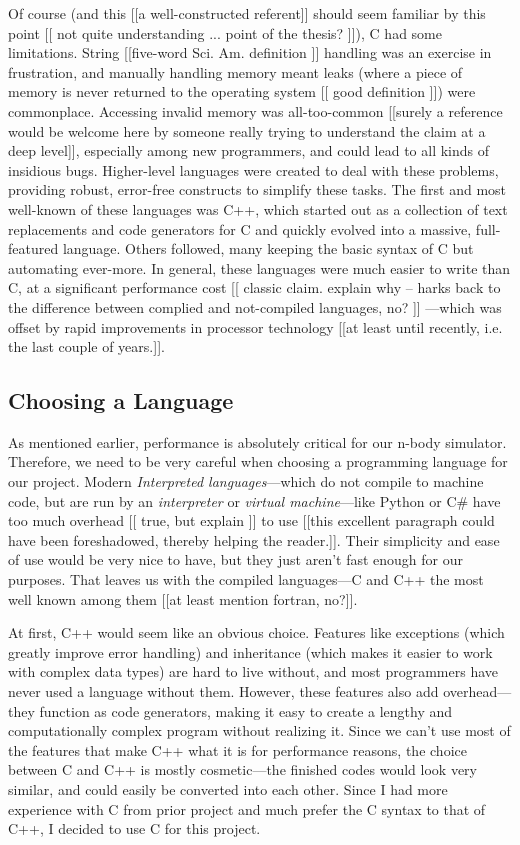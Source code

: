 \documentclass[thesis.tex]{subfiles}
\begin{document}
Of course (and this [[a well-constructed referent]] should seem familiar by this point [[  not quite understanding ... point of the thesis? ]]), C had some limitations. String [[five-word Sci. Am. definition ]] handling was an exercise in frustration, and manually handling memory meant leaks (where a piece of memory is never returned to the operating system [[ good definition  ]]) were commonplace. Accessing invalid memory was all-too-common [[surely a reference would be welcome here by someone really trying to understand the claim at a deep level]], especially among new programmers, and could lead to all kinds of insidious bugs. Higher-level languages were created to deal with these problems, providing robust, error-free constructs to simplify these tasks. The first and most well-known of these languages was C++, which started out as a collection of text replacements and code generators for C and quickly evolved into a massive, full-featured language. Others followed, many keeping the basic syntax of C but automating ever-more. In general, these languages were much easier to write than C, at a significant performance cost [[  classic claim. explain why -- harks back to the difference between complied and not-compiled languages, no? ]] ---which was offset by rapid improvements in processor technology [[at least until recently, i.e. the last couple of years.]].

\subsection{Choosing a Language}
As mentioned earlier, performance is absolutely critical for our n-body simulator. Therefore, we need to be very careful when choosing a programming language for our project. Modern \emph{Interpreted languages}---which do not compile to machine code, but are run by an \emph{interpreter} or \emph{virtual machine}---like Python or C\# have too much overhead [[ true, but explain  ]] to use [[this excellent paragraph could have been foreshadowed, thereby helping the reader.]]. Their simplicity and ease of use would be very nice to have, but they just aren't fast enough for our purposes. That leaves us with the compiled languages---C and C++ the most well known among them [[at least mention fortran, no?]].

At first, C++ would seem like an obvious choice. Features like exceptions (which greatly improve error handling) and inheritance (which makes it easier to work with complex data types) are hard to live without, and most programmers have never used a language without them. However, these features also add overhead---they function as code generators, making it easy to create a lengthy and computationally complex program without realizing it. Since we can't use most of the features that make C++ what it is for performance reasons, the choice between C and C++ is mostly cosmetic---the finished codes would look very similar, and could easily be converted into each other. Since I had more experience with C from prior project and much prefer the C syntax to that of C++, I decided to use C for this project.
\end{document}
